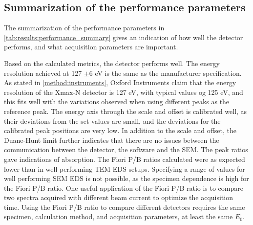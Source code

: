 \subsection{Summarization of the performance parameters}
\label{discussion:summarization_of_the_performance_parameters}


The summarization of the performance parameters in \cref{tab:results:performance_summary} gives an indication of how well the detector performs, and what acquisition parameters are important.


Based on the calculated metrics, the detector performs well.
The energy resolution achieved at 127 $\pm$6 eV is the same as the manufacturer specification.
As stated in \cref{method:instruments}, Oxford Instruments claim that the energy resolution of the Xmax-N detector is 127 eV\cite{oxford_xmax_80}, with typical values og 125 eV, and this fits well with the variations observed when using different peaks as the reference peak.
The energy axis through the scale and offset is calibrated well, as their deviations from the set values are small, and the deviations for the calibrated peak positions are very low.
In addition to the scale and offset, the Duane-Hunt limit further indicates that there are no issues between the communication between the detector, the software and the SEM.
The peak ratios gave indications of absorption.
The Fiori P/B ratios calculated were as expected lower than in well performing TEM EDS setups.
Specifying a range of values for well performing SEM EDS is not possible, as the specimen dependence is high for the Fiori P/B ratio.
One useful application of the Fiori P/B ratio is to compare two spectra acquired with different beam current to optimize the acquisition time.
Using the Fiori P/B ratio to compare different detectors requires the same specimen, calculation method, and acquisition parameters, at least the same $E_0$.


